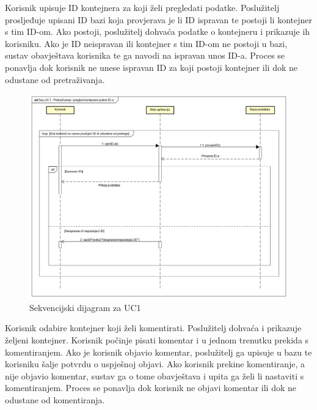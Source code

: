 			
			\noindent Korisnik upisuje ID kontejnera za koji želi pregledati podatke. Poslužitelj prosljeđuje upisani ID bazi koja provjerava je li ID ispravan te postoji li kontejner s tim ID-om. Ako postoji, poslužitelj dohvaća podatke o kontejneru i prikazuje ih korisniku. Ako je ID neispravan ili kontejner s tim ID-om ne postoji u bazi, sustav obavještava korisnika te ga navodi na ispravan unos ID-a. Proces se ponavlja dok korisnik ne unese ispravan ID za koji postoji kontejner ili dok ne odustane od pretraživanja.
			
			
			\eject
			
			\begin{figure}
				\centering
				\includegraphics[width=1.0\linewidth]{slike/Seq-UC1.png}
				\caption{Sekvencijski dijagram za UC1}
				\label{fig:UC1-Seq}
			\end{figure}
			
			\clearpage
			\eject
			
			
			\noindent Korisnik odabire kontejner koji želi komentirati. Poslužitelj dohvaća i prikazuje željeni kontejner. Korisnik počinje pisati komentar i u jednom trenutku prekida s komentiranjem. Ako je korisnik objavio komentar, poslužitelj ga upisuje u bazu te korisniku šalje potvrdu o uspješnoj objavi. Ako korisnik prekine komentiranje, a nije objavio komentar, sustav ga o tome obavještava i upita ga želi li nastaviti s komentiranjem. Proces se ponavlja dok korisnik ne objavi komentar ili dok ne odustane od komentiranja.
			
